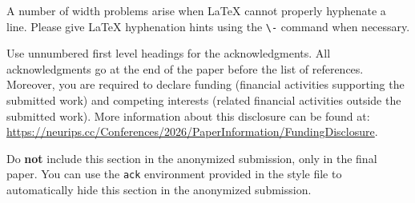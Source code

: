 \documentclass{article}
\begin{document}
A number of width problems arise when \LaTeX{} cannot properly hyphenate a
line. Please give LaTeX hyphenation hints using the \verb+\-+ command when
necessary.

\begin{ack}
Use unnumbered first level headings for the acknowledgments. All acknowledgments
go at the end of the paper before the list of references. Moreover, you are required to declare
funding (financial activities supporting the submitted work) and competing interests (related financial activities outside the submitted work).
More information about this disclosure can be found at: \url{https://neurips.cc/Conferences/2026/PaperInformation/FundingDisclosure}.


Do {\bf not} include this section in the anonymized submission, only in the final paper. You can use the \texttt{ack} environment provided in the style file to automatically hide this section in the anonymized submission.
\end{ack}















\end{document}
